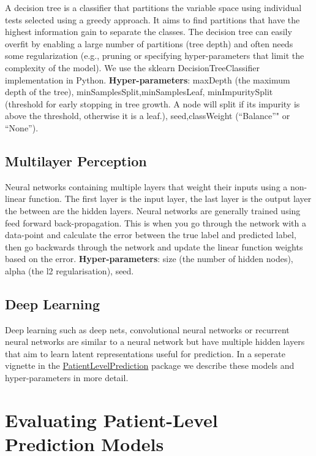 \documentclass[11pt]{book}
\begin{document}
A decision tree is a classifier that partitions the variable space using
individual tests selected using a greedy approach. It aims to find
partitions that have the highest information gain to separate the
classes. The decision tree can easily overfit by enabling a large number
of partitions (tree depth) and often needs some regularization (e.g.,
pruning or specifying hyper-parameters that limit the complexity of the
model). We use the sklearn DecisionTreeClassifier implementation in
Python. \textbf{Hyper-parameters}: maxDepth (the maximum depth of the
tree), minSamplesSplit,minSamplesLeaf, minImpuritySplit (threshold for
early stopping in tree growth. A node will split if its impurity is
above the threshold, otherwise it is a leaf.), seed,classWeight
(``Balance''" or ``None'').

\subsection{Multilayer Perception}\label{multilayer-perception}

Neural networks containing multiple layers that weight their inputs
using a non-linear function. The first layer is the input layer, the
last layer is the output layer the between are the hidden layers. Neural
networks are generally trained using feed forward back-propagation. This
is when you go through the network with a data-point and calculate the
error between the true label and predicted label, then go backwards
through the network and update the linear function weights based on the
error. \textbf{Hyper-parameters}: size (the number of hidden nodes),
alpha (the l2 regularisation), seed.

\subsection{Deep Learning}\label{deep-learning}

Deep learning such as deep nets, convolutional neural networks or
recurrent neural networks are similar to a neural network but have
multiple hidden layers that aim to learn latent representations useful
for prediction. In a seperate vignette in the
\href{https://ohdsi.github.io/PatientLevelPrediction/}{PatientLevelPrediction}
package we describe these models and hyper-parameters in more detail.

\section{Evaluating Patient-Level Prediction Models}\label{evalaution}
\end{document}
